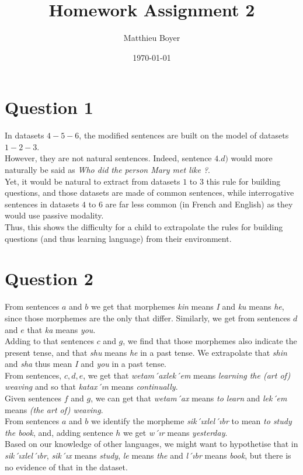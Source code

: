 \documentclass{cours}
\title{Homework Assignment 2}
\date{\today}
\author{Matthieu Boyer}
\begin{document}
    \section{Question 1}
    In datasets $4 - 5 - 6$, the modified sentences are built on the model of datasets $1 - 2 - 3$.\\
    However, they are not natural sentences. Indeed, sentence $4.d)$ would more naturally be said as \textsl{Who did the person Mary met like ?}.\\
    Yet, it would be natural to extract from datasets $1$ to $3$ this rule for building questions, and those datasets are made of common sentences, while interrogative sentences in datasets $4$ to $6$ are far less common (in French and English) as they would use passive modality.\\
    Thus, this shows the difficulty for a child to extrapolate the rules for building questions (and thus learning language) from their environment.

    \section{Question 2}
        From sentences $a$ and $b$ we get that morphemes \textsl{kin} means \textsl{I} and \textsl{ku} means \textsl{he}, since those morphemes are the only that differ. Similarly, we get from sentences $d$ and $e$ that \textsl{ka} means \textsl{you}.\\
        Adding to that sentences $c$ and $g$, we find that those morphemes also indicate the present tense, and that \textsl{shu} means \textsl{he} in a past tense. We extrapolate that \textsl{shin} and \textsl{sha} thus mean \textsl{I} and \textsl{you} in a past tense. \\
        From sentences, $c, d, e$, we get that \textsl{wetam´axlek´em} means \textsl{learning the (art of) weaving} and so that \textsl{katax´ın} means \textsl{continually}.\\
        Given sentences $f$ and $g$, we can get that \textsl{wetam´ax} means \textsl{to learn} and \textsl{lek´em} means \textsl{(the art of) weaving}.\\
        From sentences $a$ and $b$ we identify the morpheme \textsl{sik´ıxlel´ıbr} to mean \textsl{to study the book}, and, adding sentence $h$ we get \textsl{w´ır} means \textsl{yesterday}.\\
        Based on our knowledge of other languages, we might want to hypothetise that in \textsl{sik´ıxlel´ıbr}, \textsl{sik´ıx} means \textsl{study}, \textsl{le} means \textsl{the} and \textsl{l´ıbr} means \textsl{book}, but there is no evidence of that in the dataset. 
\end{document}
